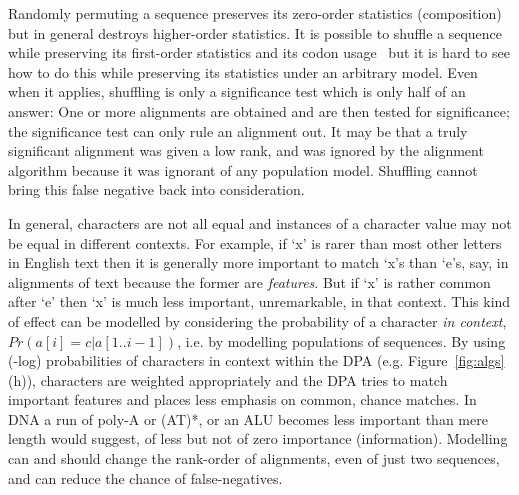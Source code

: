 \documentclass[letterpaper,11pt,oneside]{article}
\begin{document}
Randomly permuting a sequence preserves its zero-order statistics (composition)
but in general destroys higher-order statistics.
It is possible to shuffle a sequence while preserving its first-order
statistics and its codon usage~\cite{fitch83, altschul85} but
it is hard to see how to do this while preserving its statistics under
an arbitrary model.
Even when it applies,
shuffling is only a significance test which is only half of an answer:
One or more alignments are obtained and are then tested for significance;
the significance test can only rule an alignment out.
It may be that a truly significant alignment was given a low rank,
and was ignored by the alignment algorithm because it was
ignorant of any population model.
Shuffling cannot bring this false negative back into consideration.

In general, characters are not all equal and instances of a character
value may not be equal in different contexts.
For example, if `x' is rarer than most other letters in English text
then it is generally more important to match `x's than `e's, say,
in alignments of text because the former are {\em features}.
But if `x' is rather common after `e'
then `x' is much less important, unremarkable, in that context.
This kind of effect can be modelled by considering the probability
of a character {\em in context}, $Pr(a[i]=c|a[1..i-1])$,
i.e. by modelling populations of sequences.
By using (-log) probabilities of characters in context within the DPA
(e.g. Figure~\ref{fig:algs}(h)), characters are weighted appropriately and the DPA tries
to match important features and places less emphasis on common, chance matches.
In DNA a run of poly-A or (AT)*, or an ALU becomes less important than
mere length would suggest, of less but not of zero importance (information).
Modelling can and should change the rank-order of alignments,
even of just two sequences, and can reduce the chance of false-negatives.
\end{document}
